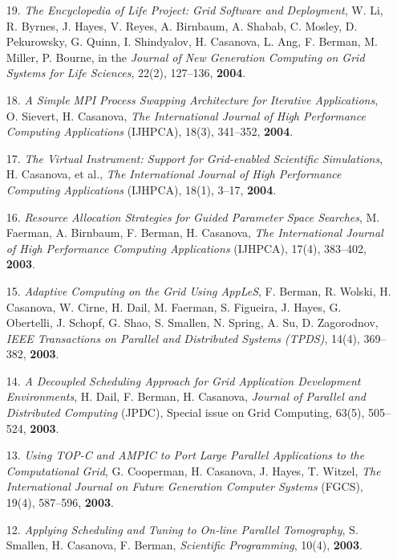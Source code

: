 \begin{enumerate}
\item [19.]
{\it The Encyclopedia of Life Project: Grid Software and Deployment},
W. Li, R. Byrnes, J. Hayes, V. Reyes, A. Birnbaum, A. Shabab, C. Mosley,
D. Pekurowsky, G. Quinn, I. Shindyalov, H. Casanova, L. Ang, F. Berman,
M. Miller, P. Bourne, in the \emph{Journal of New Generation Computing
on Grid Systems for Life Sciences}, 22(2), 127--136, {\bf 2004}.

\item [18.]
{\it A Simple MPI Process Swapping Architecture for Iterative
Applications}, O. Sievert, H. Casanova, \emph{The International Journal
of High Performance Computing Applications} (IJHPCA), 18(3),  341--352,
{\bf 2004}.

\item [17.]
{\it The Virtual Instrument: Support for Grid-enabled Scientific
Simulations}, H. Casanova, et al., \emph{The International Journal of High
Performance Computing Applications} (IJHPCA), 18(1), 3--17, {\bf 2004}.

\item [16.] 
{\it Resource Allocation Strategies for Guided Parameter Space Searches},
M. Faerman, A. Birnbaum, F. Berman, H. Casanova, \emph{The International
Journal of High Performance Computing Applications} (IJHPCA), 
17(4),  383--402, {\bf 2003}.

\item [15.]
{\it Adaptive Computing on the Grid Using AppLeS}, F. Berman, R. Wolski,
H. Casanova, W. Cirne, H. Dail, M. Faerman, S. Figueira, J. Hayes,
G. Obertelli, J. Schopf, G. Shao, S. Smallen, N. Spring, A. Su,
D. Zagorodnov, \emph{IEEE Transactions on Parallel and Distributed
Systems (TPDS)}, 14(4), 369--382, {\bf 2003}.

\item [14.]
{\it A Decoupled Scheduling Approach for Grid Application Development
Environments}, H. Dail, F. Berman, H. Casanova, \emph{Journal of Parallel
and Distributed Computing} (JPDC), Special issue on Grid Computing,
63(5), 505--524, {\bf 2003}.

\item[13.]
{\it Using TOP-C and AMPIC to Port Large Parallel Applications to the
Computational Grid}, G. Cooperman, H. Casanova, J. Hayes, T. Witzel,
\emph{The International Journal on Future Generation Computer Systems}
(FGCS), 19(4), 587--596, {\bf 2003}.  

\item[12.]
{\it Applying Scheduling and Tuning to On-line Parallel Tomography},
S. Smallen, H. Casanova, F. Berman, \emph{Scientific Programming},
10(4), {\bf 2003}. 


\end{enumerate}
